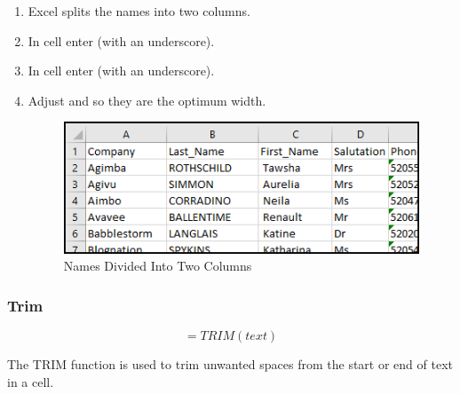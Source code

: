 \begin{enumerate}
	\item Excel splits the names into two columns. 
	\item In cell  enter  (with an underscore).
	\item In cell  enter  (with an underscore).
	\item Adjust  and  so they are the optimum width.
	
	\begin{figure}[H]
		\centering
		\includegraphics[width=\maxwidth{.95\linewidth}]{gfx/ch09_fig33}
		\caption{Names Divided Into Two Columns}
		\label{09:fig33}
	\end{figure}
\end{enumerate}

\subsubsection{Trim}

\[ =TRIM(text) \]

The TRIM function is used to trim unwanted spaces from the start or end of text in a cell.

